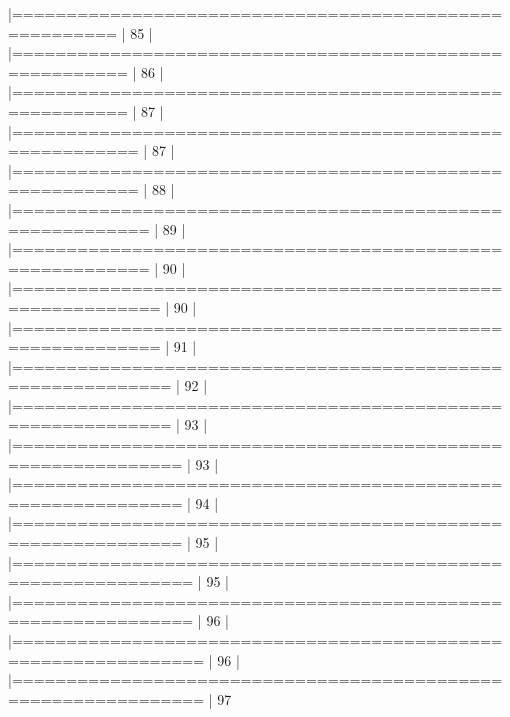 \documentclass[10pt]{article}
\newenvironment{CodeChunk}{}{}
\begin{document}
\begin{CodeChunk}
\begin{CodeChunk}
\begin{CodeOutput}
  |=======================================================          |  85%
  |                                                                       
  |========================================================         |  86%
  |                                                                       
  |========================================================         |  87%
  |                                                                       
  |=========================================================        |  87%
  |                                                                       
  |=========================================================        |  88%
  |                                                                       
  |==========================================================       |  89%
  |                                                                       
  |==========================================================       |  90%
  |                                                                       
  |===========================================================      |  90%
  |                                                                       
  |===========================================================      |  91%
  |                                                                       
  |============================================================     |  92%
  |                                                                       
  |============================================================     |  93%
  |                                                                       
  |=============================================================    |  93%
  |                                                                       
  |=============================================================    |  94%
  |                                                                       
  |=============================================================    |  95%
  |                                                                       
  |==============================================================   |  95%
  |                                                                       
  |==============================================================   |  96%
  |                                                                       
  |===============================================================  |  96%
  |                                                                       
  |===============================================================  |  97%

\end{CodeOutput}
\end{CodeChunk}
\end{CodeChunk}
\end{document}
